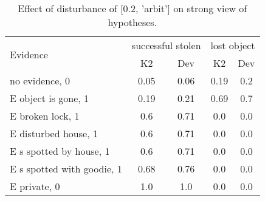\begin{table}\begin{tabular}{l|cc|cc}\toprule\multirow{2}{*}{Evidence} & \multicolumn{2}{c}{successful stolen}& \multicolumn{2}{c}{lost object}\\& {K2} & {Dev}& {K2} & {Dev}\\\midrule
no evidence, 0 & 0.05&0.06&0.19&0.2\\E object is gone, 1 & 0.19&0.21&0.69&0.7\\E broken lock, 1 & \cellcolor{Bittersweet}0.6&\cellcolor{Bittersweet}0.71&0.0&0.0\\E disturbed house, 1 & \cellcolor{Bittersweet}0.6&\cellcolor{Bittersweet}0.71&0.0&0.0\\E s spotted by house, 1 & \cellcolor{Bittersweet}0.6&\cellcolor{Bittersweet}0.71&0.0&0.0\\E s spotted with goodie, 1 & \cellcolor{Bittersweet}0.68&\cellcolor{Bittersweet}0.76&0.0&0.0\\E private, 0 & 1.0&1.0&0.0&0.0\\\bottomrule\end{tabular}\caption{Effect of disturbance of [0.2, 'arbit'] on strong view of hypotheses.}\end{table}